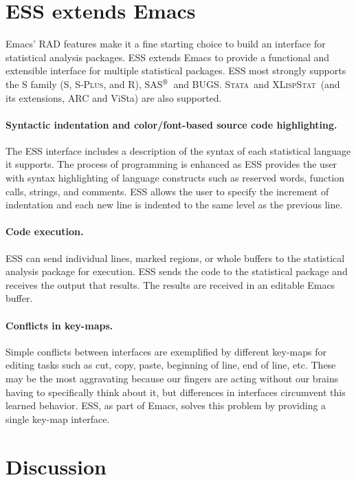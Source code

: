 \documentclass{article}
\newcommand{\SAS}{\textsc{SAS}$^{\mbox{\scriptsize\textregistered}}$}
\newcommand{\Splus}{\textsc{S-Plus}}
\newcommand*{\XLispStat}{\textsc{XLispStat}}
\newcommand*{\Stata}{\textsc{Stata}}
\begin{document}
\section{ESS extends Emacs}
\label{sec:ess-extends-emacs}

Emacs' RAD features make it a fine starting choice to
build an interface for statistical analysis packages.  ESS extends
Emacs to provide a functional and extensible interface
for multiple statistical packages. 
ESS most strongly supports the S family (S, \Splus, and R), \SAS\ and BUGS.  
\Stata\ and \XLispStat\ (and its extensions, ARC and ViSta) are
also supported.

\paragraph{Syntactic indentation and color/font-based source code
  highlighting.}  The ESS interface includes a description of the
syntax of each statistical language it supports.
The process of programming is enhanced as ESS provides the user with
syntax highlighting of language constructs such as reserved words,
function calls, strings, and comments.  ESS allows the user to specify
the increment of indentation and each new line is indented
to the same level as the previous line.

\paragraph{Code execution.}
ESS can send individual lines, marked regions, or whole buffers to the 
statistical analysis package for execution.  ESS sends the code to
the statistical package and receives the output that results.   The results
are received in an editable Emacs buffer. 

\paragraph{Conflicts in key-maps.}
\label{sec:confl-keym}

Simple conflicts between interfaces are exemplified by different
key-maps for editing tasks such as cut, copy, paste, beginning of
line, end of line, etc.  These may be the most aggravating
because our fingers are acting without our brains having to
specifically think about it, but differences in interfaces
circumvent this learned behavior.  ESS, as part of Emacs, 
solves this problem by providing a single key-map interface.

\section{Discussion}
\label{sec:discussion}
\end{document}
